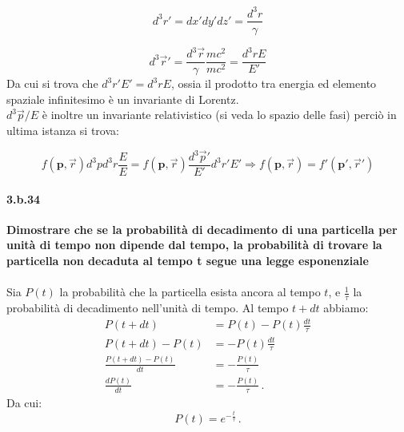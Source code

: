 \documentclass[twoside]{article}
\begin{document}
\begin{equation}%
    d^3r'=dx'dy'dz'=\frac{d^3r}{\gamma}
\end{equation}

\begin{equation}
    d^3\vec{r}'=\frac{d^3\vec{r}}{\gamma}\frac{mc^2}{mc^2}=\frac{d^3rE}{E'}
\end{equation}
Da cui si trova che $d^3 r' E' = d^3 r E$, ossia il prodotto tra energia ed elemento spaziale infinitesimo è un invariante di Lorentz.
\\
$d^3\vec{p}/E$ è inoltre un invariante relativistico (si veda lo spazio delle fasi) perciò in ultima istanza si trova:

\begin{equation}
f(\mathbf{p},\vec{r})d^3pd^3r \frac{E}{E}= f(\mathbf{p},\vec{r}) \frac{d^3\vec{p}'}{E'} d^3r' E'\Rightarrow     f(\mathbf{p},\vec{r})=f'(\mathbf{p'},\vec{r}')
\end{equation}

\paragraph{3.b.34}\textbf{Dimostrare che se la probabilità di decadimento di una particella per unità di tempo non dipende dal tempo, la probabilità di trovare la particella non decaduta al tempo t segue una legge esponenziale}\\
\\
Sia $P(t)$ la probabilità che la particella esista ancora al tempo $t$, e $\frac{1}{\tau}$ la probabilità di decadimento nell'unità di tempo. Al tempo $t+dt$ abbiamo:
\begin{align*}
P(t+dt)&=P(t)-P(t)\frac{dt}{\tau} \\
P(t+dt)-P(t)&=-P(t)\frac{dt}{\tau} \\
\frac{P(t+dt)-P(t)}{dt}&=-\frac{P(t)}{\tau} \\
\frac{dP(t)}{dt}&=-\frac{P(t)}{\tau} \, . 
\end{align*}
Da cui:
\begin{equation}
P(t)=e^{-\frac{t}{\tau}} \, .
\end{equation}
\end{document}
